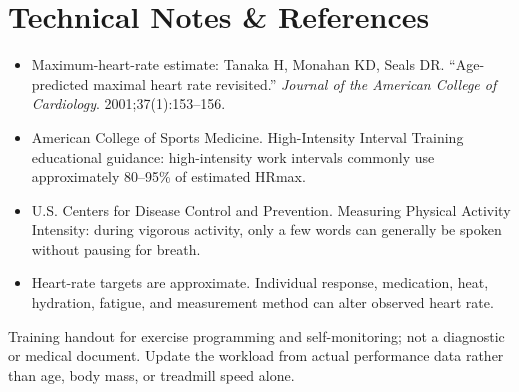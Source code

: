 \documentclass[11pt]{article}
\begin{document}
\section{Technical Notes \& References}

\small
\begin{itemize}
\item Maximum-heart-rate estimate: Tanaka H, Monahan KD, Seals DR. ``Age-predicted maximal heart rate revisited.'' \emph{Journal of the American College of Cardiology}. 2001;37(1):153--156.
\item American College of Sports Medicine. High-Intensity Interval Training educational guidance: high-intensity work intervals commonly use approximately 80--95\% of estimated HRmax.
\item U.S. Centers for Disease Control and Prevention. Measuring Physical Activity Intensity: during vigorous activity, only a few words can generally be spoken without pausing for breath.
\item Heart-rate targets are approximate. Individual response, medication, heat, hydration, fatigue, and measurement method can alter observed heart rate.
\end{itemize}

\vfill
{\footnotesize\color{graytext}
Training handout for exercise programming and self-monitoring; not a diagnostic or medical document. Update the workload from actual performance data rather than age, body mass, or treadmill speed alone.
}
\end{document}
